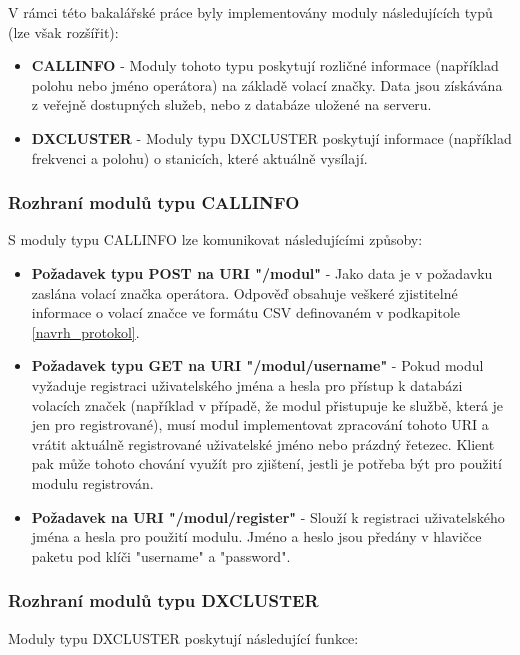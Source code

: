 V rámci této bakalářské práce byly implementovány moduly následujících typů (lze
však rozšířit):

\begin{itemize}
\item \textbf{CALLINFO} - Moduly tohoto typu poskytují rozličné informace (například polohu nebo jméno operátora)
na základě volací značky. Data jsou získávána z veřejně dostupných služeb, nebo z databáze uložené na serveru.
\item \textbf{DXCLUSTER} - Moduly typu DXCLUSTER poskytují informace (například frekvenci a polohu) o stanicích,
které aktuálně vysílají.
\end{itemize}

\subsubsection{Rozhraní modulů typu CALLINFO}

S moduly typu CALLINFO lze komunikovat následujícími způsoby:

\begin{itemize}
\item \textbf{Požadavek typu POST na URI "/modul"} - %
Jako data je v požadavku zaslána volací značka operátora. Odpověď obsahuje
veškeré zjistitelné informace o volací značce ve formátu CSV definovaném v podkapitole \ref{navrh_protokol}.
\item \textbf{Požadavek typu GET na URI "/modul/username"} - %
Pokud modul vyžaduje registraci uživatelského jména a hesla pro
přístup k databázi volacích značek (například v případě, že modul přistupuje ke službě, která je jen pro registrované), musí modul
implementovat zpracování tohoto URI a vrátit aktuálně registrované uživatelské jméno nebo prázdný řetezec. Klient pak může tohoto
chování využít pro zjištení, jestli je potřeba být pro použití modulu registrován.
\item \textbf{Požadavek na URI "/modul/register"} - Slouží k registraci uživatelského jména a hesla pro použití modulu.
Jméno a heslo jsou předány v hlavičce paketu pod klíči "username" a "password".
\end{itemize}

\subsubsection{Rozhraní modulů typu DXCLUSTER}

Moduly typu DXCLUSTER poskytují následující funkce:

